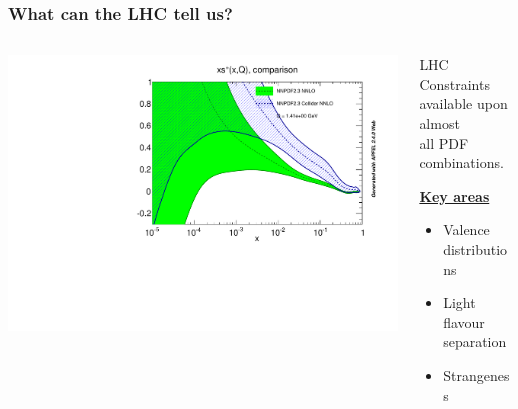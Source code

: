 \documentclass[10pt]{beamer}
\begin{document}
\begin{frame}
\frametitle{What can the LHC tell us?}
\begin{columns}
\begin{column}{0.5\textwidth}
\includegraphics[width=\textwidth]{figures/Collider_comp.pdf}
\end{column}
\begin{column}{0.5\textwidth}
LHC Constraints available upon almost \\ all PDF combinations.

\vskip10pt
\textbf{\underline{Key areas}}\\
\begin{itemize}
\item Valence distributions
\item Light flavour separation
\item Strangeness
\end{itemize}
\end{column}
\end{columns}


\end{frame}
\end{document}
